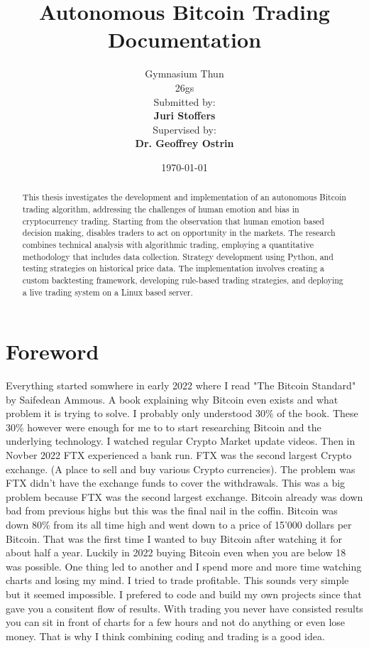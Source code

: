 \documentclass[12pt]{article}
\title{\Huge Autonomous Bitcoin Trading\\\vspace{1cm}\Large Documentation}
\author{
    \Large Gymnasium Thun\\
     26gs\\
    \vspace{1cm}
    \Large Submitted by:\\
    \vspace{0.5cm}
    \textbf{Juri Stoffers}\\
    \vspace{2cm}
    \Large Supervised by:\\
    \vspace{0.5cm}
    \textbf{Dr. Geoffrey Ostrin}
}
\date{\Large \today}
\begin{document}
\maketitle
\clearpage

\begin{abstract}
    This thesis investigates the development and implementation of an autonomous Bitcoin trading algorithm, addressing the challenges of human emotion and bias in cryptocurrency trading. 
    Starting from the observation that human emotion based decision making, disables traders to act on opportunity in the markets. 
    The research combines technical analysis with algorithmic trading, employing a quantitative methodology that includes data collection. Strategy development using Python, and testing strategies on historical price data. The implementation involves creating a custom backtesting framework, developing rule-based trading strategies, and deploying a live trading system on a Linux based server.

\end{abstract}
\clearpage

\section*{Foreword}
Everything started somwhere in early 2022 where I read "The Bitcoin Standard" by Saifedean Ammous. A book explaining why Bitcoin even exists and what problem it is trying to solve. I probably only understood 30\% of the book. These 30\% however were enough for me to to start researching Bitcoin and the underlying technology. I watched regular Crypto Market update videos. Then in Novber 2022 FTX experienced a bank run.
FTX was the second largest Crypto exchange. (A place to sell and buy various Crypto currencies). The problem was FTX didn't have the exchange funds to cover the withdrawals. This was a big problem because FTX was the second largest exchange. Bitcoin already was down bad from previous highs but this was the final nail in the coffin. Bitcoin was down 80\% from its all time high and went down to a price of 15'000 dollars per Bitcoin.
That was the first time I wanted to buy Bitcoin after watching it for about half a year. Luckily in 2022 buying Bitcoin even when you are below 18 was possible.
One thing led to another and I spend more and more time watching charts and losing my mind. I tried to trade profitable.
This sounds very simple but it seemed impossible. I prefered to code and build my own projects since that gave you a consitent flow of results. With trading you never have consisted results you can sit in front of charts for a few hours and not do anything or even lose money. That is why I think combining coding and trading is a good idea.
\end{document}
